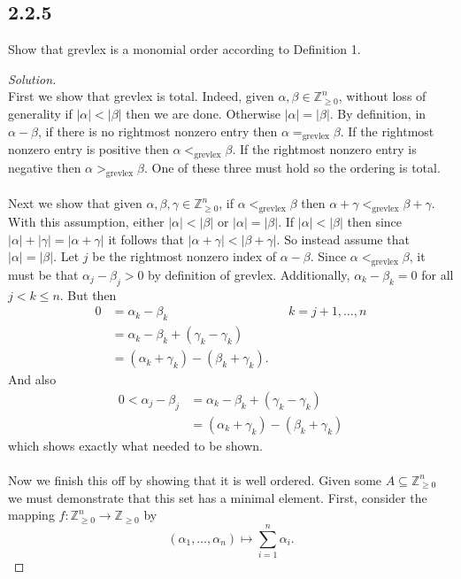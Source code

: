 \documentclass[]{article}
\newcommand\<{\langle}
\renewcommand\>{\rangle}
\newcommand{\ZZ}{\ensuremath{\mathbb{Z}}}
\newenvironment{solution}
{
	\begin{proof}[Solution] \text{ }
		\\
	}
	{
	\end{proof}
}
\begin{document}
\subsection*{2.2.5} Show that grevlex is a monomial order according to Definition 1.
\begin{solution}
	First we show that grevlex is total. Indeed, given $\alpha, \beta \in \ZZ_{\geq 0}^n$, without loss of generality if $|\alpha| < |\beta|$ then we are done. Otherwise $|\alpha| = |\beta|$. By definition, in $\alpha - \beta$, if there is no rightmost nonzero entry then $\alpha =_{\text{grevlex}} \beta$. If the rightmost nonzero entry is positive then $\alpha <_{\text{grevlex}} \beta$. If the rightmost nonzero entry is negative then $\alpha >_{\text{grevlex}} \beta$. One of these three must hold so the ordering is total.
	\\
	\\
	Next we show that given $\alpha, \beta, \gamma \in \ZZ_{\geq 0}^n$, if $\alpha <_{\text{grevlex}} \beta$ then $\alpha + \gamma <_{\text{grevlex}} \beta + \gamma$. With this assumption, either $|\alpha| < |\beta|$ or $|\alpha| = |\beta|$. If $|\alpha| < |\beta|$ then since $|\alpha| + |\gamma| = |\alpha + \gamma|$ it follows that $|\alpha + \gamma| < |\beta + \gamma|$. So instead assume that $|\alpha| = |\beta|$. Let $j$ be the rightmost nonzero index of $\alpha - \beta$. Since $\alpha <_{\text{grevlex}} \beta$, it must be that $\alpha_j - \beta_j > 0$ by definition of grevlex. Additionally, $\alpha_k - \beta_k = 0$ for all $j < k \leq n$. But then
	\begin{align*}
		0 &= \alpha_k - \beta_k && k = j+1,\dots,n\\ 
		&= \alpha_k - \beta_k + (\gamma_k - \gamma_k) \\
		&= (\alpha_k + \gamma_k) - (\beta_k + \gamma_k).
	\end{align*}
	And also
	\begin{align*}
		0 < \alpha_j - \beta_j &= \alpha_k - \beta_k + (\gamma_k - \gamma_k) \\
		&= (\alpha_k + \gamma_k) - (\beta_k + \gamma_k)
	\end{align*}
	which shows exactly what needed to be shown.
	\\
	\\
	Now we finish this off by showing that it is well ordered. Given some $A \subseteq \ZZ_{\geq 0}^n$ we must demonstrate that this set has a minimal element. First, consider the mapping $f : \ZZ_{\geq 0}^n \to \ZZ_{\geq 0}$ by 
	$$
		(\alpha_1,\dots, \alpha_n) \mapsto \sum_{i = 1}^{n} \alpha_i.
$$
\end{solution}
\end{document}
